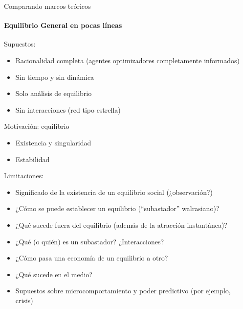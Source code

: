 \documentclass[11pt]{beamer}
\begin{document}
\begin{frame}
\begin{comment}
\begin{frame}{Modelos Basados en Agentes}
\framesubtitle{Cellular automata: Game of life}
    \textbf{Rules:}\\
Denoting on cells as alive and off cells as dead, Conway defined the rule in terms of four life processes:
\begin{itemize}
    \item Birth, a dead cell with exactly three live neighbors becomes alive at the next time
step;
\item Survival, a live cell with exactly two or three live neighbors stays alive;
\item Loneliness, a live cell with fewer than two neighbors dies
\item Dead, a dead cell with fewer than three neighbors stays dead
\end{itemize}
\end{frame}
\end{comment}

\begin{frame}{Comparando marcos teóricos}
\framesubtitle{Equilibrio General en pocas líneas}
\begin{multicols}{2}
Supuestos:
\begin{itemize}
  \footnotesize  \item Racionalidad completa (agentes optimizadores completamente informados)
\item Sin tiempo y sin dinámica
\item Solo análisis de equilibrio
\item Sin interacciones (red tipo estrella)
\end{itemize}
Motivación: equilibrio
\begin{itemize}
\footnotesize \item Existencia y singularidad
\item Estabilidad
\end{itemize}
Limitaciones:
\begin{itemize}
 \footnotesize   \item Significado de la existencia de un equilibrio social (¿observación?)
\item ¿Cómo se puede establecer un equilibrio (``subastador'' walrasiano)?
\item ¿Qué sucede fuera del equilibrio (además de la atracción instantánea)?
\item ¿Qué (o quién) es un subastador? ¿Interacciones?
\item ¿Cómo pasa una economía de un equilibrio a otro?
\item ¿Qué sucede en el medio?
\item Supuestos sobre microcomportamiento y poder predictivo (por ejemplo, crisis)
\end{itemize}
\end{multicols}
    

\end{frame}
\end{frame}
\end{document}
